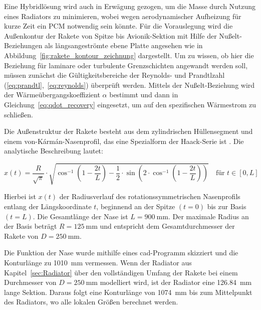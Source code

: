 Eine Hybridlösung wird auch in Erwägung gezogen, um die Masse durch Nutzung eines Radiators zu minimieren, wobei wegen aerodynamischer Aufheizung für kurze Zeit ein PCM notwendig sein könnte.
Für die Vorauslegung wird die Außenkontur der Rakete von Spitze bis Avionik-Sektion mit Hilfe der Nußelt-Beziehungen als längsangeströmte ebene Platte angesehen
wie in Abbildung~\ref{fig:rakete_kontour_zeichnung} dargestellt.
Um zu wissen, ob hier die Beziehung für laminare oder turbulente Grenzschichten angewandt werden soll, müssen zunächst die Gültigkeitsbereiche der Reynolds- und Prandtlzahl (\ref{eq:prandtl},~\ref{eq:reynolds}) überprüft werden.
Mittels der Nußelt-Beziehung wird der Wärmeübergangskoeffizient $\alpha$ bestimmt und dann in Gleichung~\ref{eq:qdot_recovery} eingesetzt, um auf den spezifischen Wärmestrom zu schließen.

Die Außenstruktur der Rakete besteht aus dem zylindrischen Hüllensegment und einem von-Kármán-Nasenprofil, das eine
Spezialform der Haack-Serie ist \cite{Stoney-1954}. Die analytische Beschreibung lautet:

\begin{equation*}
  \label{eq:karman_nase}
  x(t) = \frac{R}{\sqrt{\pi}} \cdot \sqrt{
  \cos^{-1}\left(1 - \frac{2t}{L} \right)
  - \frac{1}{2} \cdot \sin\left(2 \cdot \cos^{-1}\left(1 - \frac{2t}{L} \right) \right)
  }
  \quad \text{für } t \in [0, L]
\end{equation*}

Hierbei ist $x(t)$ der Radiusverlauf des rotationssymmetrischen Nasenprofils entlang der Längskoordinate $t$, beginnend an der Spitze $(t=0)$ bis zur Basis $(t=L)$.
Die Gesamtlänge der Nase ist $L = \SI{900}{\milli\meter}$. Der maximale Radius an der Basis beträgt $R = \SI{125}{\milli\meter}$ und entspricht dem Gesamtdurchmesser der Rakete von $D = \SI{250}{\milli\meter}$.

Die Funktion der Nase wurde mithilfe eines \ac{cad}-Programm skizziert und die Konturlänge zu \SI{1010}{\milli\meter} vermessen. Wenn der Radiator aus Kapitel~\ref{sec:Radiator} über den vollständigen Umfang der Rakete
bei einem Durchmesser von $D = \SI{250}{\milli\meter}$ modelliert wird, ist der Radiator eine \SI{126,84}{\milli\meter} lange Sektion.
Daraus folgt eine Konturlänge von \SI{1074}{\milli\meter} bis zum Mittelpunkt des Radiators, wo alle lokalen Größen berechnet werden.

